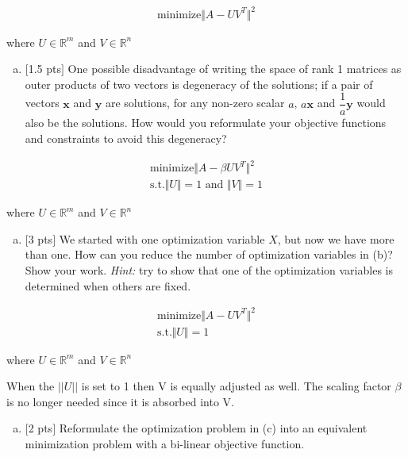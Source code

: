 \documentclass[12pt]{article}
\begin{document}
\begin{align*}
\text{minimize} \Vert A-UV^T \Vert^{2}
\end{align*}

where $U \in \mathbb{R}^{m}$ and $V \in \mathbb{R}^{n}$

\begin{enumerate}[(b)]
\item
$[$1.5 pts$]$ One possible disadvantage of writing the space of rank 1 matrices as outer products of two vectors is degeneracy of the solutions; if a pair of vectors $\mathbf{x}$ and $\mathbf{y}$ are solutions, for any non-zero scalar $a$, $a\mathbf{x}$ and $\dfrac{1}{a}\mathbf{y}$ would also be the solutions. How would you reformulate your objective functions and constraints to avoid this degeneracy?
\end{enumerate}
\vspace{.25cm}

\begin{align*}
\text{minimize} \Vert A-\beta UV^T \Vert^{2} \\
\text{s.t.} \Vert U\Vert = 1 \text{ and }\Vert V \Vert =1 
\end{align*}

where $U \in \mathbb{R}^{m}$ and $V \in \mathbb{R}^{n}$


\begin{enumerate}[(c)]
\item 
$[$3 pts$]$ We started with one optimization variable $X$, but now we have more than one. How can you reduce the number of optimization variables in (b)? Show your work. {\it Hint:} try to show that one of the optimization variables is determined when others are fixed.
\end{enumerate}
\vspace{.25cm}

\begin{align*}
\text{minimize} \Vert A- UV^T \Vert^{2} \\
\text{s.t.} \Vert U\Vert = 1 
\end{align*}

where $U \in \mathbb{R}^{m}$ and $V \in \mathbb{R}^{n}$

When the $||U||$ is set to 1 then V is equally adjusted as well. The scaling factor $\beta$ is no longer needed since it is absorbed into V. 

\begin{enumerate}[(d)]
\item 
$[$2 pts$]$ Reformulate the optimization problem in (c) into an equivalent minimization problem with a bi-linear objective function.
\end{enumerate}
\end{document}
